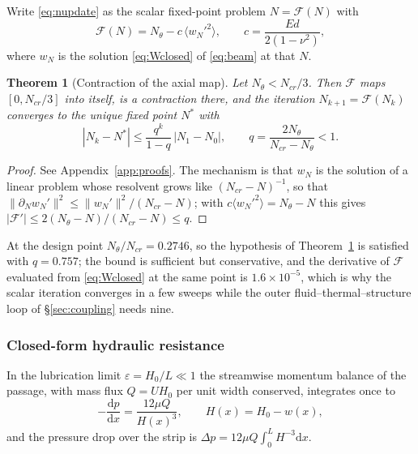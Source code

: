 \documentclass[11pt,a4paper]{article}
\newtheorem{theorem}{Theorem}[section]
\newcommand{\dd}{\mathrm{d}}
\begin{document}
Write \eqref{eq:nupdate} as the scalar fixed-point problem $N=\mathcal F(N)$ with
\begin{equation}
\mathcal F(N)=N_\theta-c\,\bigl\langle w_N'^2\bigr\rangle,\qquad
c=\frac{Ed}{2(1-\nu^2)},
\label{eq:map}
\end{equation}
where $w_N$ is the solution \eqref{eq:Wclosed} of \eqref{eq:beam} at that $N$.

\begin{theorem}[Contraction of the axial map]
\label{thm:contraction}
Let $N_\theta<N_{cr}/3$. Then $\mathcal F$ maps $[0,N_{cr}/3]$ into itself, is a contraction
there, and the iteration $N_{k+1}=\mathcal F(N_k)$ converges to the unique fixed point $N^*$
with
\begin{equation}
|N_k-N^*|\le\frac{q^k}{1-q}\,|N_1-N_0|,\qquad
q=\frac{2N_\theta}{N_{cr}-N_\theta}<1 .
\label{eq:rate}
\end{equation}
\end{theorem}

\begin{proof}
See Appendix~\ref{app:proofs}. The mechanism is that $w_N$ is the solution of a linear
problem whose resolvent grows like $(N_{cr}-N)^{-1}$, so that
$\|\partial_N w_N'\|^2\le\|w_N'\|^2/(N_{cr}-N)$; with
$c\langle w_N'^2\rangle=N_\theta-N$ this gives
$|\mathcal F'|\le2(N_\theta-N)/(N_{cr}-N)\le q$.
\end{proof}

At the design point $N_\theta/N_{cr}=0.2746$, so the hypothesis of
Theorem~\ref{thm:contraction} is satisfied with $q=0.757$; the bound is sufficient but
conservative, and the derivative of $\mathcal F$ evaluated from \eqref{eq:Wclosed} at the same
point is $1.6\times10^{-5}$, which is why the scalar iteration converges in a few sweeps while
the outer fluid--thermal--structure loop of \S\ref{sec:coupling} needs nine.

\subsubsection{Closed-form hydraulic resistance}
\label{sec:lubrication}

In the lubrication limit $\varepsilon=H_0/L\ll1$ the streamwise momentum balance of the
passage, with mass flux $Q=UH_0$ per unit width conserved, integrates once to
\begin{equation}
-\frac{\dd p}{\dd x}=\frac{12\mu Q}{H(x)^3},\qquad H(x)=H_0-w(x),
\label{eq:lubmom}
\end{equation}
and the pressure drop over the strip is $\Delta p=12\mu Q\int_0^L H^{-3}\dd x$.
\end{document}
